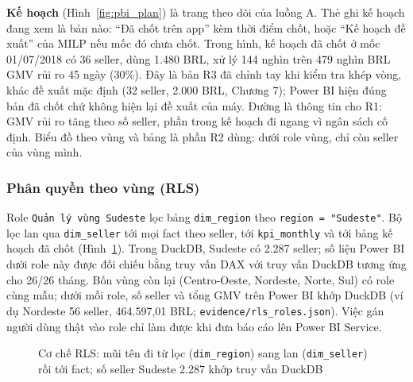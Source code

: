 \textbf{Kế hoạch} (Hình~\ref{fig:pbi_plan}) là trang theo dõi của luồng A. Thẻ  ghi kế hoạch đang xem là bản nào: ``Đã chốt trên app'' kèm thời điểm chốt, hoặc ``Kế hoạch đề xuất'' của MILP nếu mốc đó chưa chốt. Trong hình, kế hoạch đã chốt ở mốc 01/07/2018 có 36 seller, dùng 1.480 BRL, xử lý 144 nghìn trên 479 nghìn BRL GMV rủi ro 45 ngày (30\%). Đây là bản R3 đã chỉnh tay khi kiểm tra khép vòng, khác đề xuất mặc định (32 seller, 2.000 BRL, Chương 7); Power BI hiện đúng bản đã chốt chứ không hiện lại đề xuất của máy. Đường  là thông tin cho R1: GMV rủi ro tăng theo số seller, phần trong kế hoạch đi ngang vì ngân sách cố định. Biểu đồ theo vùng  và bảng  là phần R2 dùng: dưới role vùng, chỉ còn seller của vùng mình.

\subsubsection*{Phân quyền theo vùng (RLS)}
Role \texttt{Quản lý vùng Sudeste} lọc bảng \texttt{dim\_region} theo \texttt{region = "Sudeste"}. Bộ lọc lan qua \texttt{dim\_seller} tới mọi fact theo seller, tới \texttt{kpi\_monthly} và tới bảng kế hoạch đã chốt (Hình~\ref{fig:pbi_rls}). Trong DuckDB, Sudeste có 2.287 seller; số liệu Power BI dưới role này được đối chiếu bằng truy vấn DAX với truy vấn DuckDB tương ứng cho 26/26 tháng. Bốn vùng còn lại (Centro-Oeste, Nordeste, Norte, Sul) có role cùng mẫu; dưới mỗi role, số seller và tổng GMV trên Power BI khớp DuckDB (ví dụ Nordeste 56 seller, 464.597,01 BRL; \texttt{evidence/rls\_roles.json}). Việc gán người dùng thật vào role chỉ làm được khi đưa báo cáo lên Power BI Service.

\begin{figure}[htbp]
\centering
{}
\caption{Cơ chế RLS: mũi tên đi từ lọc (\texttt{dim\_region}) sang lan (\texttt{dim\_seller}) rồi tới fact; số seller Sudeste 2.287 khớp truy vấn DuckDB}
\label{fig:pbi_rls}
\end{figure}

